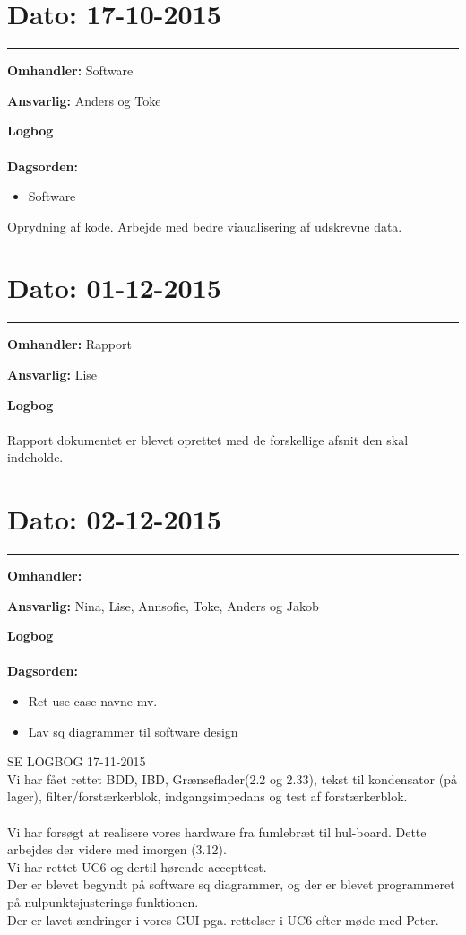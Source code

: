 \section{Dato: 17-10-2015 }
\hrule

\textbf{Omhandler:} Software

\textbf{Ansvarlig:} Anders og Toke

\textbf{Logbog}
\\
\\
\textbf{Dagsorden:}
\begin{itemize}
	\item Software
\end{itemize}

Oprydning af kode. Arbejde med bedre viaualisering af udskrevne data. 



\section{Dato: 01-12-2015 }
\hrule

\textbf{Omhandler:} Rapport

\textbf{Ansvarlig:} Lise

\textbf{Logbog}
\\
\\
Rapport dokumentet er blevet oprettet med de forskellige afsnit den skal indeholde. 




\section{Dato: 02-12-2015 }
\hrule

\textbf{Omhandler:} 

\textbf{Ansvarlig:} Nina, Lise, Annsofie, Toke, Anders og Jakob

\textbf{Logbog}
\\
\\
\textbf{Dagsorden:}
\begin{itemize}
	\item Ret use case navne mv.
	\item Lav sq diagrammer til software design
\end{itemize}

SE LOGBOG 17-11-2015 \\
Vi har fået rettet BDD, IBD, Grænseflader(2.2 og 2.33), tekst til kondensator (på lager), filter/forstærkerblok, indgangsimpedans og test af forstærkerblok.
\\
\\
Vi har forsøgt at realisere vores hardware fra fumlebræt til hul-board. Dette arbejdes der videre med imorgen (3.12).\\
Vi har rettet UC6 og dertil hørende accepttest. \\
Der er blevet begyndt på software sq diagrammer, og der er blevet programmeret på nulpunktsjusterings funktionen. \\
Der er lavet ændringer i vores GUI pga. rettelser i UC6 efter møde med Peter.
	
